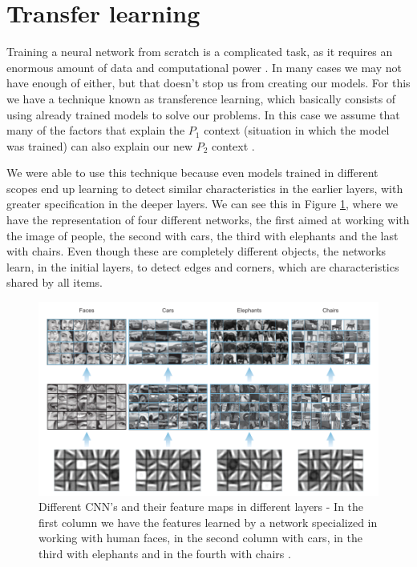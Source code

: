 \section{Transfer learning} \label{transferlearning}
Training a neural network from scratch is a complicated task, as it requires an enormous amount of data and computational power \cite{elgendy2020}. In many cases we may not have enough of either, but that doesn't stop us from creating our models. For this we have a technique known as transference learning, which basically consists of using already trained models to solve our problems. In this case we assume that many of the factors that explain the $P_1$ context (situation in which the model was trained) can also explain our new $P_2$ context \cite{goodfellow2016}.

We were able to use this technique because even models trained in different scopes end up learning to detect similar characteristics in the earlier layers, with greater specification in the deeper layers. We can see this in Figure \ref{fig:figure139}, where we have the representation of four different networks, the first aimed at working with the image of people, the second with cars, the third with elephants and the last with chairs. Even though these are completely different objects, the networks learn, in the initial layers, to detect edges and corners, which are characteristics shared by all items.

\begin{figure}
    \centering
    \includegraphics[scale=0.4]{"Part 3 - Learning Systems/Supervised Learning/Deep Learning/images/figure139.png"}
    \caption{Different CNN's and their feature maps in different layers - In the first column we have the features learned by a network specialized in working with human faces, in the second column with cars, in the third with elephants and in the fourth with chairs \cite{elgendy2020}.}
    \label{fig:figure139}
\end{figure}

